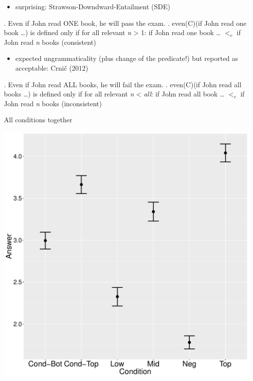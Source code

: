 \documentclass[ignorenonframetext,]{beamer}
\providecommand{\tightlist}{%
  \setlength{\itemsep}{0pt}\setlength{\parskip}{0pt}}
\begin{document}
\begin{frame}

\begin{itemize}
\tightlist
\item
  surprising: Strawson-Downdward-Entailment (SDE) 
\end{itemize}

\ex. Even if John read ONE book, he will pass the exam. \a. even(C)(if
John read one book \ldots{}) is defined only if for all relevant
\emph{n} \textgreater{} 1: if John read one book \ldots{} \(<_c\) if
John read \emph{n} books \hfill (consistent)

\begin{itemize}
\tightlist
\item
  expected ungrammaticality (plus change of the predicate!) but reported
  as acceptable: Crnič (2012)
\end{itemize}

\ex. Even if John read ALL books, he will fail the exam. \a. even(C)(if
John read all books \ldots{}) is defined only if for all relevant
\emph{n} \textless{} \emph{all}: if John read all book \ldots{} \(<_c\)
if John read \emph{n} books \hfill (inconsistent)

\end{frame}

\begin{frame}{All conditions together}

\begin{center}
\includegraphics[scale=0.23]{exp1-part_1-2-errorbars.pdf}
\end{center}

\end{frame}
\end{document}
